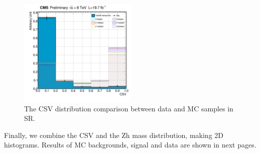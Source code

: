 \begin{figure}[hbtp]
  \begin{center}
    \includegraphics[width=0.5\textwidth]{figure/CH3/h_sigCSV.png}
  \end{center}
  \caption{\label{fig:h_sigCSV}The CSV distribution comparison between data and MC samples in SR.}
\end{figure}

Finally, we combine the CSV and the Zh mass distribution, making 2D histograms. Results of MC backgrounds, signal and data are shown in next pages.

